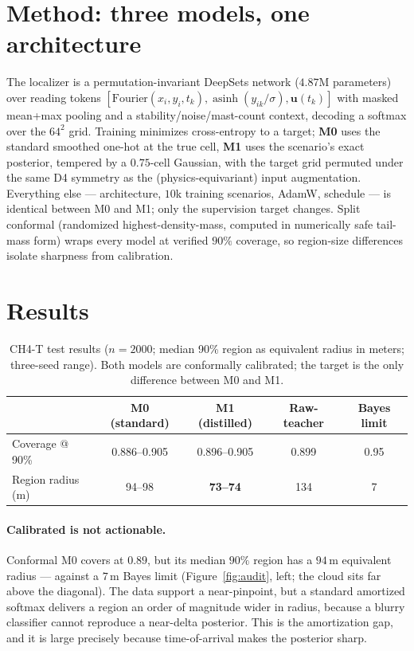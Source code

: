 \documentclass{article}
\begin{document}
\section{Method: three models, one architecture}

The localizer is a permutation-invariant DeepSets network ($4.87$M parameters) over reading
tokens $[\mathrm{Fourier}(x_i,y_i,t_k), \operatorname{asinh}(y_{ik}/\sigma),
\boldsymbol{u}(t_k)]$ with masked mean+max pooling and a stability/noise/mast-count context,
decoding a softmax over the $64^2$ grid. Training minimizes cross-entropy to a target;
\textbf{M0} uses the standard smoothed one-hot at the true cell, \textbf{M1} uses the
scenario's exact posterior, tempered by a $0.75$-cell Gaussian, with the target grid
permuted under the same D4 symmetry as the (physics-equivariant) input augmentation.
Everything else --- architecture, $10$k training scenarios, AdamW, schedule --- is identical
between M0 and M1; only the supervision target changes. Split conformal (randomized
highest-density-mass, computed in numerically safe tail-mass form) wraps every model at
verified $90\%$ coverage, so region-size differences isolate sharpness from calibration.

\section{Results}

\begin{table}[t]
\centering\small
\caption{CH4-T test results ($n=2000$; median 90\% region as equivalent radius in meters;
three-seed range). Both models are conformally calibrated; the target is the only
difference between M0 and M1.}
\begin{tabular}{lcccc}
\toprule
& M0 (standard) & M1 (distilled) & Raw-teacher & Bayes limit \\
\midrule
Coverage @ 90\% & 0.886--0.905 & 0.896--0.905 & 0.899 & 0.95 \\
Region radius (m) & 94--98 & \textbf{73--74} & 134 & 7 \\
\bottomrule
\end{tabular}
\end{table}

\paragraph{Calibrated is not actionable.} Conformal M0 covers at $0.89$, but its median
$90\%$ region has a $94$\,m equivalent radius --- against a $7$\,m Bayes limit
(Figure~\ref{fig:audit}, left; the cloud sits far above the diagonal). The data support a
near-pinpoint, but a standard amortized softmax delivers a region an order of magnitude
wider in radius, because a blurry classifier cannot reproduce a near-delta posterior. This
is the amortization gap, and it is large precisely because time-of-arrival makes the
posterior sharp.
\end{document}
